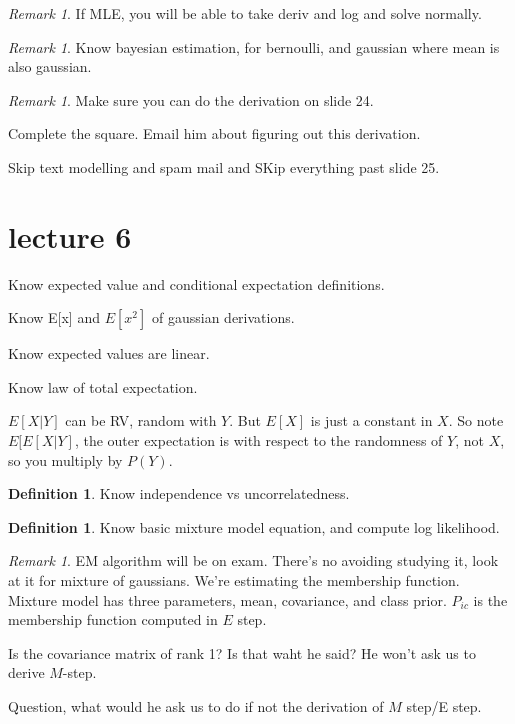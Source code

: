 \documentclass{amsbook}
\theoremstyle{plain}
\numberwithin{section}{chapter}
\numberwithin{equation}{chapter}
\theoremstyle{definition}
\newtheorem{Def}[theorem]{Definition}
\theoremstyle{remark}
\newtheorem{rem}[theorem]{Remark}
\begin{document}
\begin{rem}
If MLE, you will be able to take deriv and log and solve normally. 
\end{rem}

\begin{rem}
Know bayesian estimation, for bernoulli, and gaussian where mean is also gaussian. 
\end{rem}

\begin{rem}
Make sure you can do the derivation on slide 24. 
\end{rem}

Complete the square. Email him about figuring out this derivation. 


Skip text modelling and spam mail and SKip everything past slide 25. 

\section{lecture 6}

Know expected value and conditional expectation definitions. 

Know E[x] and $E[x^2]$ of gaussian derivations. 

Know expected values are linear. 

Know law of total expectation. 

$E[X|Y]$ can be RV, random with $Y$. But $E[X]$ is just a constant in $X$. So note $E[E[X|Y]$, the outer expectation is with respect to the randomness of $Y$, not $X$, so you multiply by $P(Y)$. 

\begin{Def}
Know independence vs uncorrelatedness. 
\end{Def}

\begin{Def}
Know basic mixture model equation, and compute log likelihood. 
\end{Def}

\begin{rem}
EM algorithm will be on exam. There's no avoiding studying it, look at it for mixture of gaussians. We're estimating the membership function. Mixture model has three parameters, mean, covariance, and class prior. $P_{ic}$ is the membership function computed in $E$ step. 

Is the covariance matrix of rank 1? Is that waht he said? He won't ask us to derive $M$-step. 

Question, what would he ask us to do if not the derivation of $M$ step/E step. 
\end{rem}
\end{document}
